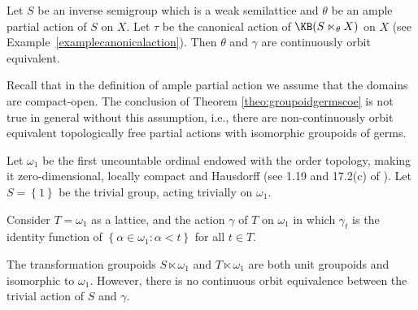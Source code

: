 \begin{corollary}
Let $S$ be an inverse semigroup which is a weak semilattice and $\theta$ be an ample partial action of $S$ on $X$. Let $\tau$ be the canonical action of $\KB(S\ltimes_\theta X)$ on $X$ (see Example~\ref{examplecanonicalaction}). Then $\theta$ and $\gamma$ are continuously orbit equivalent.
\end{corollary}

Recall that in the definition of ample partial action we assume that the domains are compact-open. The conclusion of Theorem \ref{theo:groupoidgermscoe} is not true in general without this assumption, i.e., there are non-continuously orbit equivalent topologically free partial actions with isomorphic groupoids of germs.

\begin{example}\label{exampleomega1isbad}
Let $\omega_1$ be the first uncountable ordinal endowed with the order topology, making it zero-dimensional, locally compact and Hausdorff (see 1.19 and 17.2(c) of \cite{MR0264581}). Let $S=\left\{1\right\}$ be the trivial group, acting trivially on $\omega_1$.

Consider $T=\omega_1$ as a lattice, and the action $\gamma$ of $T$ on $\omega_1$ in which $\gamma_t$ is the identity function of $\left\{\alpha\in\omega_1:\alpha<t\right\}$ for all $t\in T$.

The transformation groupoids $S\ltimes\omega_1$ and $T\ltimes\omega_1$ are both unit groupoids and isomorphic to $\omega_1$. However, there is no continuous orbit equivalence between the trivial action of $S$ and $\gamma$.


\end{example}
